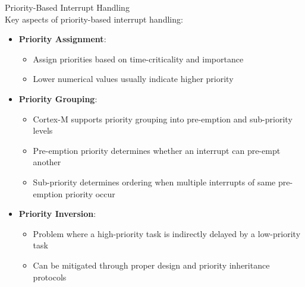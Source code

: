 \begin{concept}{Priority-Based Interrupt Handling}\\
Key aspects of priority-based interrupt handling:
\begin{itemize}
    \item \textbf{Priority Assignment}:
    \begin{itemize}
        \item Assign priorities based on time-criticality and importance
        \item Lower numerical values usually indicate higher priority
    \end{itemize}
    \item \textbf{Priority Grouping}:
    \begin{itemize}
        \item Cortex-M supports priority grouping into pre-emption and sub-priority levels
        \item Pre-emption priority determines whether an interrupt can pre-empt another
        \item Sub-priority determines ordering when multiple interrupts of same pre-emption priority occur
    \end{itemize}
    \item \textbf{Priority Inversion}:
    \begin{itemize}
        \item Problem where a high-priority task is indirectly delayed by a low-priority task
        \item Can be mitigated through proper design and priority inheritance protocols
    \end{itemize}
\end{itemize}
\end{concept}

